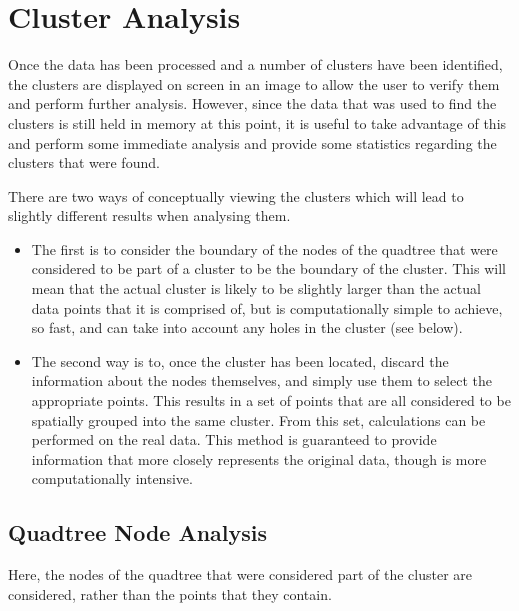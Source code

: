 
\section{Cluster Analysis}
\label{sec:cluster_analysis}

Once the data has been processed and a number of clusters have been identified,
the clusters are displayed on screen in an image to allow the user to verify
them and perform further analysis. However, since the data that was used to
find the clusters is still held in memory at this point, it is useful to take
advantage of this and perform some immediate analysis and provide some
statistics regarding the clusters that were found.

There are two ways of conceptually viewing the clusters which will lead to
slightly different results when analysing them.

\begin{itemize}

	\item The first is to consider the boundary of the nodes of the quadtree
		that were considered to be part of a cluster to be the boundary of the
		cluster. This will mean that the actual cluster is likely to be
		slightly larger than the actual data points that it is comprised of,
		but is computationally simple to achieve, so fast, and can take into
		account any holes in the cluster (see below).

	\item The second way is to, once the cluster has been located, discard the
		information about the nodes themselves, and simply use them to select
		the appropriate points. This results in a set of points that are all
		considered to be spatially grouped into the same cluster. From this
		set, calculations can be performed on the real data. This method is
		guaranteed to provide information that more closely represents the
		original data, though is more computationally intensive.

\end{itemize}

\subsection{Quadtree Node Analysis}
\label{sub:quadtree_node_analysis}

Here, the nodes of the quadtree that were considered part of the cluster are
considered, rather than the points that they contain.

